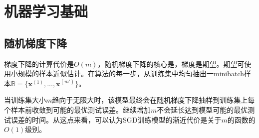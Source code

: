 \chapter{机器学习基础}
    \section{随机梯度下降}
        梯度下降的计算代价是$O(m)$，随机梯度下降的核心是，梯度是期望。期望可使用小规模的样本近似估计。在算法的每一步，从训练集中均匀抽出一minibatch样本$\mathbb{B} = \{ {\bm{x}^{(1)}},...,{\bm{x}^{(m')}}\}$。
        
        当训练集大小$m$趋向于无限大时，该模型最终会在随机梯度下降抽样到训练集上每个样本前收敛到可能的最优测试误差。继续增加$m$不会延长达到模型可能的最优测试误差的时间。从这点来看，可以认为SGD训练模型的渐近代价是关于$m$的函数的$O(1)$级别。
